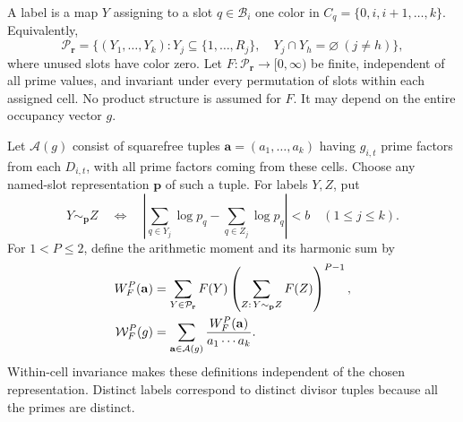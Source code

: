 A label is a map $Y$ assigning to a slot $q\in\mathcal B_i$ one
color in $C_q=\{0,i,i+1,\ldots,k\}$. Equivalently,
\[
 \mathcal P_{\mathbf r}=
 \{(Y_1,\ldots,Y_k):Y_j\subseteq\{1,\ldots,R_j\},\quad
                  Y_j\cap Y_h=\varnothing\ (j\ne h)\},
\]
where unused slots have color zero. Let
$F:\mathcal P_{\mathbf r}\to[0,\infty)$ be finite, independent
of all prime values, and invariant under every permutation of slots
within each assigned cell. No product structure is assumed for $F$.
It may depend on the entire occupancy vector $g$.

Let $\mathcal A(g)$ consist of squarefree tuples
$\mathbf a=(a_1,\ldots,a_k)$ having $g_{i,t}$ prime factors from
each $D_{i,t}$, with all prime factors coming from these cells.
Choose any named-slot representation $\mathbf p$ of such a tuple.
For labels $Y,Z$, put
\[
 Y\sim_{\mathbf p}Z
 \quad\Longleftrightarrow\quad
 \left|\sum_{q\in Y_j}\log p_q-\sum_{q\in Z_j}\log p_q\right|<b
                     \quad(1\le j\le k).
\]
For $1<P\le2$, define the arithmetic moment and its harmonic sum by
\begin{align}
 W_F^P(\mathbf a)
   &=\sum_{Y\in\mathcal P_{\mathbf r}}F(Y)
           \left(\sum_{Z:\,Y\sim_{\mathbf p}Z}F(Z)\right)^{P-1},
       \notag\\
 \mathcal W_F^P(g)
   &=\sum_{\mathbf a\in\mathcal A(g)}
                  \frac{W_F^P(\mathbf a)}{a_1\cdots a_k}.
                                                  \label{eq:cc-moment}
\end{align}
Within-cell invariance makes these definitions independent of the
chosen representation. Distinct labels correspond to distinct divisor
tuples because all the primes are distinct.

